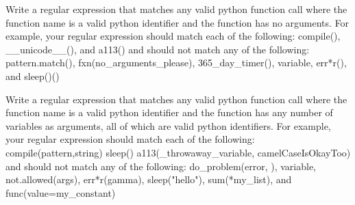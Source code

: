 

\begin{problem}
Write a regular expression that matches any valid python function call where the function name is a valid python identifier and the function has no arguments.
For example, your regular expression should match each of the following: %
    compile(),
    __unicode__(), and
    a113()
and should not match any of the following:
    pattern.match(),
    fxn(no_arguments_please),
    365_day_timer(),
    variable,
    err*r(), and
    sleep()()
\end{problem}

\begin{problem}
Write a regular expression that matches any valid python function call where the function name is a valid python identifier and the function has any number of variables as arguments, all of which are valid python identifiers.
For example, your regular expression should match each of the following: %
    compile(pattern,string)
    sleep()
    a113(_throwaway_variable,   camelCaseIsOkayToo)
and should not match any of the following:
    do_problem(error, ),
    variable,
    not.allowed(args),
    err*r(gamma),
    sleep("hello"),
    sum(*my_list), and
    func(value=my_constant)
\end{problem}









